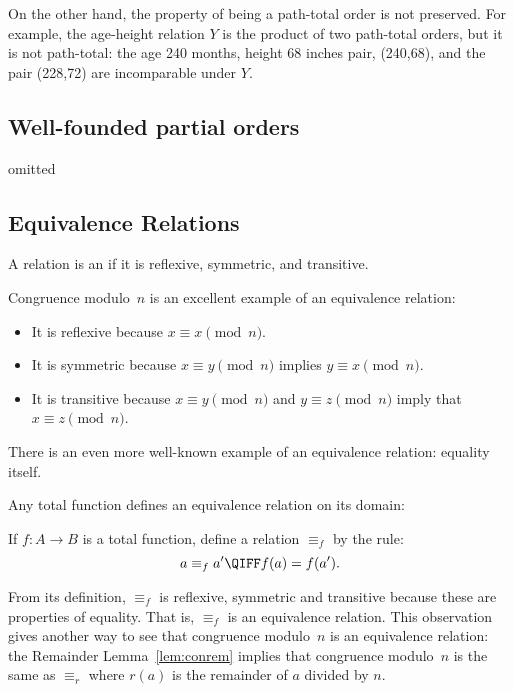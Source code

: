 \begin{definition}
On the other hand, the property of being a path-total order is not preserved.
For example, the age-height relation $Y$ is the product of two path-total
orders, but it is not path-total: the age 240 months, height 68 inches pair,
(240,68), and the pair (228,72) are incomparable under $Y$.

\begin{problems}

\classproblems
{}

\end{problems}

\begin{editingnotes}
\chapter*{Well-founded partial orders}
omitted
\end{editingnotes}

\section{Equivalence Relations}\label{equiv_rel_sec}
\begin{definition}
A relation is an  if it is reflexive,
symmetric, and transitive.
\end{definition}

Congruence modulo~$n$ is an excellent example of an equivalence
relation:
\begin{itemize}

\item
It is reflexive because $x \equiv x \pmod{n}$.

\item
It is symmetric because $x \equiv y \pmod{n}$ implies $y \equiv x
\pmod{n}$.

\item
It is transitive because $x \equiv y \pmod{n}$ and $y \equiv z
\pmod{n}$ imply that $x \equiv z \pmod{n}$.

\end{itemize}
There is an even more well-known example of an equivalence relation:
equality itself.

Any total function defines an equivalence relation on its domain:
\begin{definition}\label{equiv_f}
If $f:A \to B$ is a total function, define a relation $\equiv_f$ by the rule:
\[
a \equiv_f a'  \QIFF f(a) = f(a').
\]
\end{definition}
From its definition, $\equiv_f$ is reflexive, symmetric and transitive
because these are properties of equality.  That is, $\equiv_f$ is an
equivalence relation.  This observation gives another way to see that
congruence modulo~$n$ is an equivalence relation: the Remainder
Lemma~\ref{lem:conrem} implies that congruence modulo~$n$ is the same
as $\equiv_r$ where $r(a)$ is the remainder of $a$ divided by $n$.


\end{definition}
